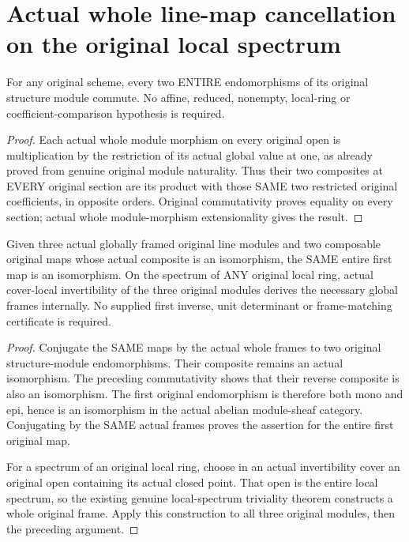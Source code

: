 \section{Actual whole line-map cancellation on the original local spectrum}
\label{sec:local-line-map-cancellation}

\begin{theorem}
\label{sc0-local-line-cancel:unit-commutativity}
\leanok
For any original scheme, every two ENTIRE endomorphisms of its
original structure module commute. No affine, reduced, nonempty,
local-ring or coefficient-comparison hypothesis is required.
\end{theorem}
\begin{proof}
Each actual whole module morphism on every original open is
multiplication by the restriction of its actual global value at
one, as already proved from genuine original module naturality.
Thus their two composites at EVERY original section are its product
with those SAME two restricted original coefficients, in opposite
orders. Original commutativity proves equality on every section;
actual whole module-morphism extensionality gives the result.
\end{proof}

\begin{theorem}
\label{sc0-local-line-cancel:entire-first-factor}
\leanok
Given three actual globally framed original line modules and two
composable original maps whose actual composite is an isomorphism,
the SAME entire first map is an isomorphism. On the spectrum of ANY
original local ring, actual cover-local invertibility of the three
original modules derives the necessary global frames internally.
No supplied first inverse, unit determinant or frame-matching
certificate is required.
\end{theorem}
\begin{proof}
Conjugate the SAME maps by the actual whole frames to two original
structure-module endomorphisms. Their composite remains an actual
isomorphism. The preceding commutativity shows that their reverse
composite is also an isomorphism. The first original endomorphism
is therefore both mono and epi, hence is an isomorphism in the
actual abelian module-sheaf category. Conjugating by the SAME actual
frames proves the assertion for the entire first original map.

For a spectrum of an original local ring, choose in an actual
invertibility cover an original open containing its actual closed
point. That open is the entire local spectrum, so the existing
genuine local-spectrum triviality theorem constructs a whole
original frame. Apply this construction to all three original
modules, then the preceding argument.
\end{proof}

